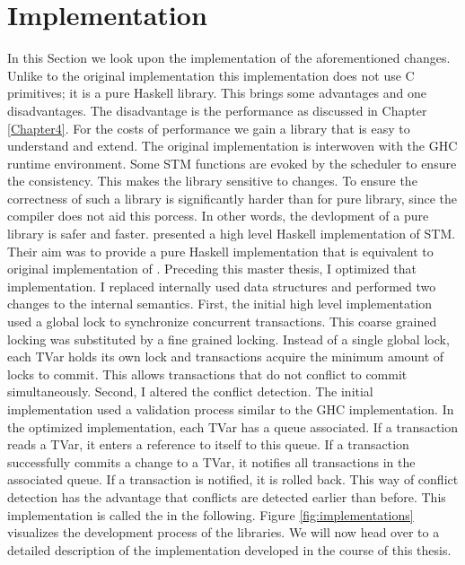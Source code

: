 
\chapter{Implementation} %

\label{Chapter3}

In this Section we look upon the implementation of the aforementioned changes. Unlike to the original
implementation this implementation does not use C primitives; it is a pure Haskell library. This brings some advantages 
and one disadvantages. The disadvantage is the performance as discussed in Chapter \ref{Chapter4}.
For the costs of performance we gain a library that is easy to understand and extend. The original 
implementation is interwoven with the GHC runtime environment. Some STM functions are evoked by 
the scheduler to ensure the consistency. This makes the library sensitive to changes. 
To ensure the correctness of such a library is significantly harder than for pure library, since
the compiler does not aid this porcess. In other words, the devlopment of a pure library is safer
and faster. \parencite{STMHigh} presented a high level Haskell implementation of STM. Their aim
was to provide a pure Haskell implementation that is equivalent to original implementation of 
\parencite{STMBase}. Preceding this master thesis, I optimized that implementation. I replaced
internally used data structures and performed two changes to the internal semantics. First, 
the initial high level implementation used a global lock to synchronize concurrent transactions.
This coarse grained locking was substituted by a fine grained locking. Instead of a single
global lock, each TVar holds its own lock and transactions acquire the minimum amount of 
locks to commit. This allows transactions that do not conflict to commit simultaneously.
Second, I altered the conflict detection. The initial implementation used a validation process
similar to the GHC implementation. In the optimized implementation, each TVar has a queue associated. If a transaction reads 
a TVar, it enters a reference to itself to this queue. If a transaction successfully commits a change to a TVar, it 
notifies all transactions in the associated queue. If a transaction is notified, it is rolled back.
This way of conflict detection has the advantage that conflicts are detected earlier than before.
This implementation is called the  in the following. Figure 
\ref{fig:implementations} visualizes the development process of the libraries.
We will now head over to a detailed description of the implementation developed in the course of this 
thesis. 

